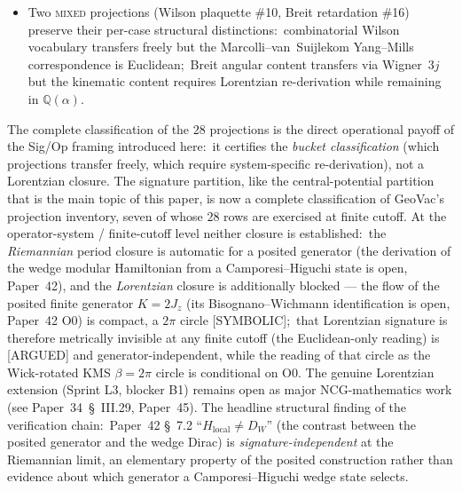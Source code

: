 \documentclass[twocolumn,pra,amsmath,amssymb,superscriptaddress]{revtex4-2}
\begin{document}
\begin{itemize}
Krein operator-system level at finite cutoff via Sprint L2-B/C/D/E
(Paper~32 \S~VIII.E.B/C/D/E):\ the Krein space, Lorentzian Dirac
$D_L = i^t \, \not{\!\!D}_{g_r}$ per van~den~Dungen 2016 Prop~4.1, and
Connes axiom audit at BBB $(m, n) = (4, 6)$ are constructed, and the
Krein period-closure identities close bit-exactly at every tested
$(n_{\max}, N_t) \in \{1, 2, 3\} \times \{1, 11, 21\}$.  These
identities are \emph{signature-blind}, however (the same compactness
mechanism as above;\ the signature-blindness reading is [ARGUED]), so
they do \emph{not} constitute a Lorentzian
literal identification;\ the genuine Lorentzian propinquity extension
(blocker B1) remains open at Sprint L3 scope.
\item Two \textsc{mixed} projections (Wilson plaquette \#10, Breit
retardation \#16) preserve their per-case structural distinctions:\
combinatorial Wilson vocabulary transfers freely but the
Marcolli--van~Suijlekom Yang--Mills correspondence is Euclidean;\
Breit angular content transfers via Wigner~$3j$ but the kinematic
content requires Lorentzian re-derivation while remaining in
$\mathbb{Q}(\alpha)$.
\end{itemize}

The complete classification of the $28$ projections is the direct
operational payoff of the Sig/Op framing introduced here:\ it
certifies the \emph{bucket classification} (which projections transfer
freely, which require system-specific re-derivation), not a Lorentzian
closure.
The signature partition, like the central-potential partition that is
the main topic of this paper, is now a complete classification of
GeoVac's projection inventory, seven of whose $28$ rows are exercised
at finite cutoff.  At the
operator-system / finite-cutoff level neither closure is established:\
the \emph{Riemannian} period closure is automatic for a posited
generator (the derivation of the wedge modular Hamiltonian from a
Camporesi--Higuchi state is open, Paper~42), and the
\emph{Lorentzian} closure is additionally blocked --- the flow of the
posited finite generator $K = 2J_z$ (its Bisognano--Wichmann
identification is open, Paper~42 O0) is compact, a $2\pi$ circle
[SYMBOLIC];\ that Lorentzian signature is therefore metrically
invisible at any finite cutoff (the Euclidean-only reading) is [ARGUED]
and generator-independent, while the reading of that circle as the
Wick-rotated KMS $\beta = 2\pi$ circle is conditional on O0.  The
genuine Lorentzian extension (Sprint
L3, blocker B1) remains open as major NCG-mathematics work (see
Paper~34~\S~III.29, Paper~45).  The headline structural finding of
the verification chain:\ Paper~42 \S~7.2 ``$H_{\mathrm{local}} \neq D_W$''
(the contrast between the posited generator and the wedge Dirac) is
\emph{signature-independent} at the Riemannian limit, an elementary
property of the posited construction rather than evidence about which
generator a Camporesi--Higuchi wedge state selects.
\end{document}
